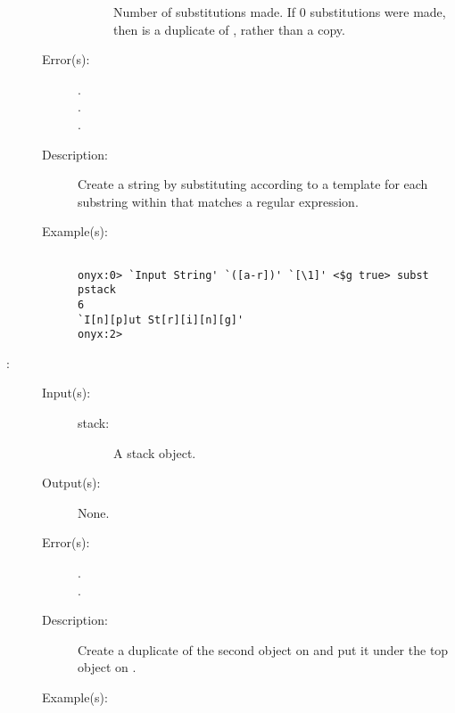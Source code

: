 \begin{description}
\begin{description}
\begin{description}
			Number of substitutions made.  If 0 substitutions were
			made, then  is a duplicate of
			, rather than a copy.
		\end{description}
	\item[Error(s): ]
		\begin{description}\item[]
		\item[.]
		\item[.]
		\item[.]
		\end{description}
	\item[Description: ]
		Create a string by substituting according to a template for each
		substring within  that matches a regular
		expression.
	\item[Example(s): ]\begin{verbatim}

onyx:0> `Input String' `([a-r])' `[\1]' <$g true> subst pstack
6
`I[n][p]ut St[r][i][n][g]'
onyx:2>
		\end{verbatim}
	\end{description}
\label{systemdict:sunder}
\item[{\onyxop{stack}{sunder}{--}}: ]
	\begin{description}\item[]
	\item[Input(s): ]
		\begin{description}\item[]
		\item[stack: ]
			A stack object.
		\end{description}
	\item[Output(s): ] None.
	\item[Error(s): ]
		\begin{description}\item[]
		\item[.]
		\item[.]
		\end{description}
	\item[Description: ]
		Create a duplicate of the second object on  and put
		it under the top object on .
	\item[Example(s): ]\begin{verbatim}


\end{verbatim}
\end{description}
\end{description}
